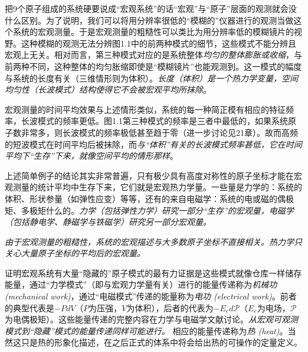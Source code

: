 把9个原子组成的系统硬要说成“宏观系统”的话“宏观”与“原子”层面的观测就会没什么区别。为了说明，我们可以将用分辨率很低的“模糊的”仪器进行的观测当做这个系统的宏观测量。于是宏观测量的粗糙性可以类比为用分辨率低的模糊镜片的视野。这种模糊的观测无法分辨图1.1中的前两种模式的细节，这些模式不能分辨且宏观上无关。相对而言，第三种模式对应的是系统整体{\it 均匀的整体膨胀或收缩}，与前两种不同，这种整体的均匀胀缩即使是“模糊镜片”也能观测到。这一模式的幅度与系统的长度有关（三维情形则为体积）。{\it 长度（体积）是一个热力学变量，空间均匀性（长波模式）结构使得它不会被宏观平均所抹除}。

宏观测量的时间平均效果与上述情形类似，系统的每一种简正模有相应的特征频率，长波模式的频率更低。图1.1第三种模式的频率是三者中最低的，如果系统原子数非常多，则长波模式的频率极低甚至趋于零（进一步讨论见21章）。故而高频的短波模式在时间平均后被抹除，而{\it 与“体积”有关的长波模式频率甚低，它在时间平均下“生存”下来，就像空间平均的情形那样}。

上述简单例子的结论其实非常普遍，只有极少具有高度对称性的原子坐标才能在宏观测量的统计平均中生存下来，它们就是宏观热力学量。一些量是力学的：系统的体积、形状参量（如弹性应变）等等，还有的来自电磁学：系统的电或磁的偶极矩、多极矩什么的。{\it 力学（包括弹性力学）研究一部分“生存”的宏观量，电磁学（包括静电学、静磁学与铁磁学）研究另一部分宏观量。}

{\it 由于宏观测量的粗糙性，系统的宏观描述与大多数原子坐标不直接相关。热力学只关心大量原子坐标的平均后的宏观量。} 

证明宏观系统有大量“隐藏的”原子模式的最有力证据是这些模式就像仓库一样储存能量，通过“力学模式”（即与宏观力学量有关）进行的能量传递称为{\it 机械功 (mechanical work)}，通过“电磁模式”传递的能量称为{\it 电功 (electrical work)}。前者的典型代表是$-P dV$（$P$为压强，$V$为体积），后者的代表为$-E_e d\mathscr{P}$（$E_e$为电场，$\mathscr{P}$为电偶极矩）。这些能量传递的完整内容在力学与电磁学文献讨论。{\it 从宏观可观测模式到“隐藏”模式的能量传递同样可能进行。} 相应的能量传递称为{\it 热 (heat)}。当然这只是热的形象化描述，在之后正式的体系中将会给出热的可操作的定量定义。

